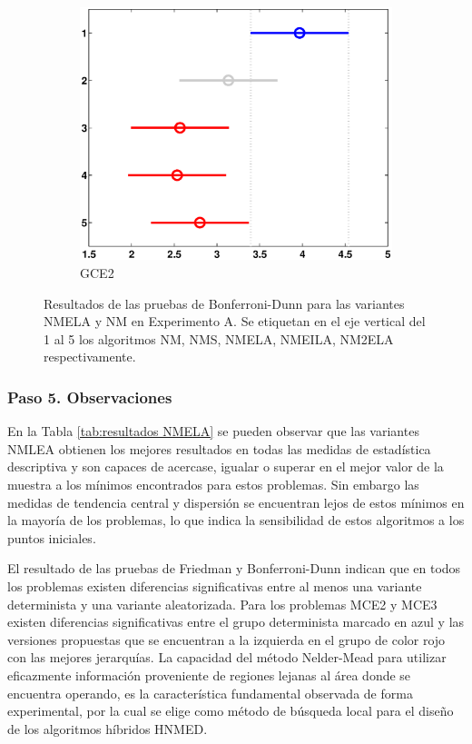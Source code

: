 \begin{figure}
\begin{subfigure}[b]{0.49\linewidth}
		\includegraphics[width=\linewidth]{Figures/A-NMELA_FB_P5}
		\caption{GCE2} \label{fig:M4} 
	\end{subfigure}
	\caption[Resultados de las pruebas de Bonferroni-Dunn para las variantes NMELA y NM en Experimento A.]{Resultados de las pruebas de Bonferroni-Dunn para las variantes NMELA y NM en Experimento A. Se etiquetan en el eje vertical del 1 al 5 los algoritmos NM, NMS, NMELA, NMEILA, NM2ELA respectivamente.} \label{fig: Bonferroni-Dunn -NMELA} 
	
\end{figure}
\subsubsection{Paso 5. Observaciones}
En la Tabla \ref{tab:resultados NMELA} se pueden observar que las variantes NMLEA obtienen los mejores resultados en todas las medidas de estadística descriptiva y son capaces de acercase, igualar o superar en el mejor valor de la muestra a los mínimos encontrados para estos problemas. Sin embargo las medidas de tendencia central y dispersión  se encuentran lejos de estos mínimos en la mayoría de los problemas, lo que indica la sensibilidad de estos algoritmos a los puntos iniciales.

 El resultado de las pruebas de Friedman y Bonferroni-Dunn indican que en todos los problemas existen diferencias significativas entre al menos una variante determinista y una variante aleatorizada. Para los problemas MCE2 y MCE3 existen diferencias significativas entre el grupo determinista marcado en azul y las versiones propuestas que se encuentran a la izquierda en el grupo de color rojo con las mejores jerarquías. La capacidad del método Nelder-Mead para utilizar eficazmente información proveniente de regiones lejanas al área donde se encuentra operando, es la característica fundamental observada de forma experimental, por la cual se elige como método de búsqueda local para el diseño de los algoritmos híbridos HNMED. 



